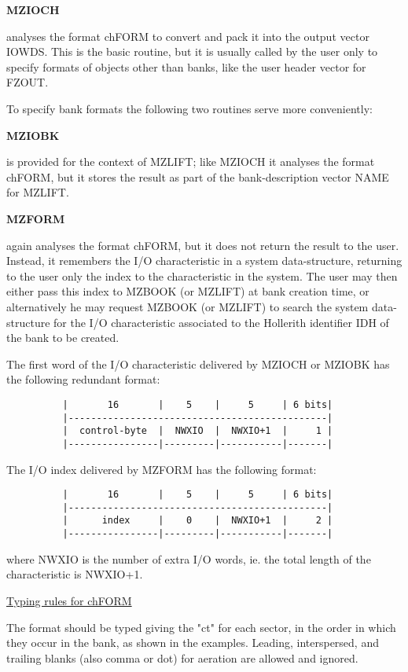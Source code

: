 {\large\bf MZIOCH}

analyses the format chFORM to convert and pack it into
the output vector IOWDS.
This is the basic routine,
but it is usually called by the user only to specify formats
of objects other than banks, like the user header vector for FZOUT.

To specify bank formats the following two routines serve more
conveniently:

{\large\bf MZIOBK}

is provided for the context of MZLIFT;
like MZIOCH it analyses the format chFORM,
but it stores the result as part of the bank-description vector
NAME for MZLIFT.

{\large\bf MZFORM}

again analyses the format chFORM,
but it does not return the result to the user.
Instead,
it remembers the I/O characteristic in a system data-structure,
returning to the user only the index to the characteristic
in the system.
The user may then either pass this index to MZBOOK (or MZLIFT)
at bank creation time,
or alternatively he may request MZBOOK (or MZLIFT) to search
the system data-structure for the I/O characteristic
associated to the Hollerith identifier IDH of the bank to be
created.

The first word of the I/O characteristic delivered by MZIOCH or
MZIOBK has the following redundant format:
\begin{verbatim}
          |       16       |    5    |     5     | 6 bits|
          |----------------------------------------------|
          |  control-byte  |  NWXIO  |  NWXIO+1  |     1 |
          |----------------|---------|-----------|-------|

\end{verbatim}
The I/O index delivered by MZFORM has the following format:
\begin{verbatim}
          |       16       |    5    |     5     | 6 bits|
          |----------------------------------------------|
          |      index     |    0    |  NWXIO+1  |     2 |
          |----------------|---------|-----------|-------|
\end{verbatim} 
where NWXIO is the number of extra I/O words,
ie. the total length of the characteristic is NWXIO+1.

\ul{Typing rules for chFORM}

The format should be typed giving the "ct" for each sector,
in the order in which they occur in the bank, as shown in the
examples.
Leading, interspersed, and trailing blanks (also comma or dot)
for aeration are allowed and ignored.

